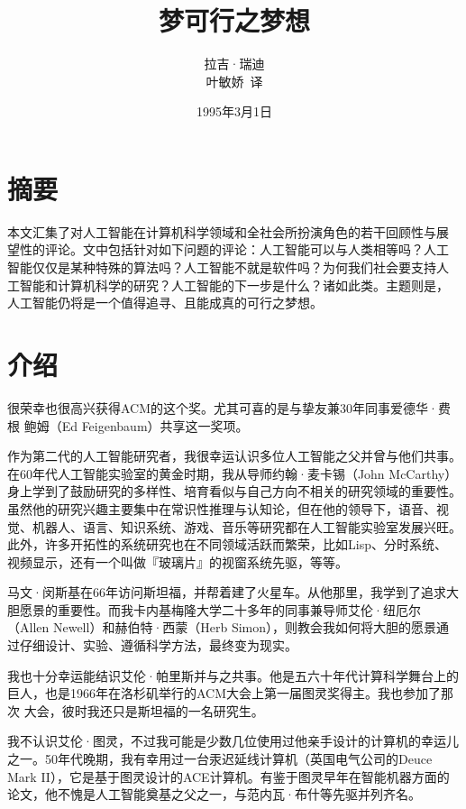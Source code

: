 \documentclass[12pt,a4paper]{article}
\begin{document}
\title{\whei 梦可行之梦想}
\author{\kai 拉吉·瑞迪\\
  \kai 叶敏娇~译}
\date{\kai 1995年3月1日}

\maketitle

\section{摘要}
本文汇集了对人工智能在计算机科学领域和全社会所扮演角色的若干回顾性与展
望性的评论。文中包括针对如下问题的评论：人工智能可以与人类相等吗？人工
智能仅仅是某种特殊的算法吗？人工智能不就是软件吗？为何我们社会要支持人
工智能和计算机科学的研究？人工智能的下一步是什么？诸如此类。主题则是，
人工智能仍将是一个值得追寻、且能成真的可行之梦想。

\section{介绍}
很荣幸也很高兴获得ACM的这个奖。尤其可喜的是与挚友兼30年同事爱德华·费根
鲍姆（Ed Feigenbaum）共享这一奖项。

作为第二代的人工智能研究者，我很幸运认识多位人工智能之父并曾与他们共事。
在60年代人工智能实验室的黄金时期，我从导师约翰·麦卡锡（John McCarthy）
身上学到了鼓励研究的多样性、培育看似与自己方向不相关的研究领域的重要性。
虽然他的研究兴趣主要集中在常识性推理与认知论，但在他的领导下，语音、视
觉、机器人、语言、知识系统、游戏、音乐等研究都在人工智能实验室发展兴旺。
此外，许多开拓性的系统研究也在不同领域活跃而繁荣，比如Lisp、分时系统、
视频显示，还有一个叫做『玻璃片』的视窗系统先驱，等等。

马文·闵斯基在66年访问斯坦福，并帮着建了火星车。从他那里，我学到了追求大
胆愿景的重要性。而我卡内基梅隆大学二十多年的同事兼导师艾伦·纽厄尔
（Allen Newell）和赫伯特·西蒙（Herb Simon），则教会我如何将大胆的愿景通
过仔细设计、实验、遵循科学方法，最终变为现实。

我也十分幸运能结识艾伦·帕里斯并与之共事。他是五六十年代计算科学舞台上的
巨人，也是1966年在洛杉矶举行的ACM大会上第一届图灵奖得主。我也参加了那次
大会，彼时我还只是斯坦福的一名研究生。

我不认识艾伦·图灵，不过我可能是少数几位使用过他亲手设计的计算机的幸运儿
之一。50年代晚期，我有幸用过一台汞迟延线计算机（英国电气公司的Deuce
Mark II），它是基于图灵设计的ACE计算机。有鉴于图灵早年在智能机器方面的
论文，他不愧是人工智能奠基之父之一，与范内瓦·布什等先驱并列齐名。
\end{document}
